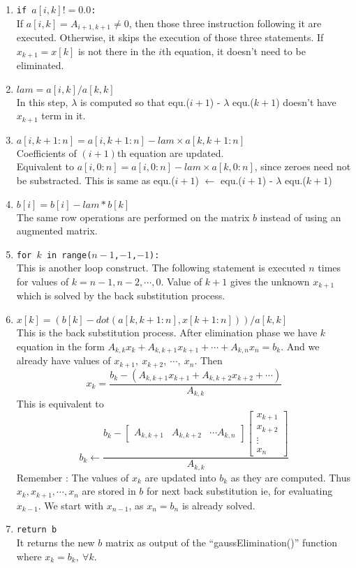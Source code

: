 \begin{commentary}
\begin{enumerate}[label=Line \arabic*]
	\item \texttt{if $a[i,k] != 0.0$:} \\ If $a[i,k] = A_{i+1,k+1} \ne 0$, then those three instruction following it are executed.
		Otherwise, it skips the execution of those three statements.
		If $x_{k+1}=x[k]$ is not there in the $i$th equation, it doesn't need to be eliminated.
	\item \texttt{$lam = a[i,k]/a[k,k]$} \\ In this step, $\lambda$ is computed so that equ.($i+1$) - $\lambda$ equ.($k+1$) doesn't have $x_{k+1}$ term in it.
	\item \texttt{$a[i,k+1:n] = a[i,k+1:n]-lam \times a[k,k+1:n]$} \\ Coefficients of $(i+1)$th equation are updated.\\
		Equivalent to $a[i,0:n] = a[i,0:n] - lam \times a[k,0:n]$, since zeroes need not be substracted.
		This is same as equ.($i+1$) $\leftarrow$ equ.($i+1$) - $\lambda$ equ.($k+1$)
	\item \texttt{$b[i] = b[i]-lam*b[k]$} \\ The same row operations are performed on the matrix $b$ instead of using an augmented matrix.
	\item \texttt{for $k$ in range($n-1$,$-1$,$-1$):} \\ This is another loop construct.
		The following statement is executed $n$ times for values of $k = n-1, n-2, \cdots, 0$.
		Value of $k+1$ gives the unknown $x_{k+1}$ which is solved by the back substitution process.
	\item \texttt{$x[k] = (b[k]-dot(a[k,k+1:n],x[k+1:n]))/a[k,k]$} \\ This is the back substitution process.
		After elimination phase we have $k$ equation in the form $A_{k,k}x_{k} + A_{k,k+1}x_{k+1}+\cdots+A_{k,n}x_n = b_k$.
		And we already have values of $x_{k+1},\ x_{k+2},\ \cdots,\ x_n$.
		Then
	\[x_{k} = \frac{b_k - (A_{k,k+1}x_{k+1} + A_{k,k+2}x_{k+2}+\cdots)}{A_{k,k}}\]
	This is equivalent to 
	\[ b_k \leftarrow \frac{ b_k - \begin{bmatrix}A_{k,k+1} & A_{k,k+2} & \cdots A_{k,n} \end{bmatrix}\begin{bmatrix} x_{k+1} \\ x_{k+2} \\ \vdots \\ x_n \end{bmatrix}}{A_{k,k}} \]
	Remember : The values of $x_k$ are updated into $b_k$ as they are computed.
		Thus $x_{k}, x_{k+1}, \cdots, x_n$ are stored in $b$ for next back substitution ie, for evaluating $x_{k-1}$.
		We start with $x_{n-1}$, as $x_n = b_n$ is already solved.
	\item \texttt{return b} \\ It returns the new $b$ matrix as output of the ``gaussElimination()'' function where $x_k = b_k,\ \forall k$.
\end{enumerate}
\end{commentary}

